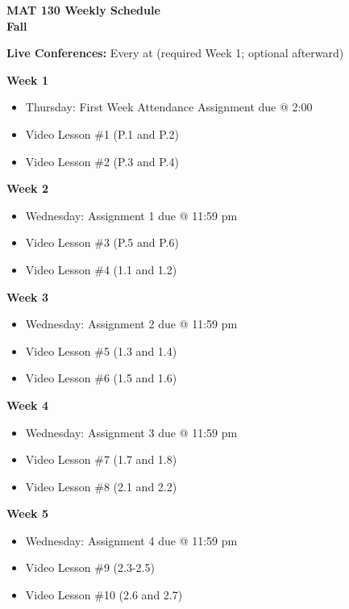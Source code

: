 \documentclass[12pt]{letter}
\author{Jacob Ayers}
\newcommand{\red}[1]{{\color{red}{#1}}} %
\newcommand{\?}{\stackrel{?}{=}}
\begin{document}
	
	\begin{center}
		\textbf{MAT 130 Weekly Schedule \\ Fall \red{Year}}
	\end{center}
	\textbf{Live Conferences:} Every \red{day} at \red{time} (required Week 1; optional afterward)
	
	\textbf{Week 1} \begin{itemize} \vspace{-12pt}
		\item Thursday: First Week Attendance Assignment due @ 2:00
		\item Video Lesson \#1 (P.1 and P.2)
		\item Video Lesson \#2 (P.3 and P.4)
	\end{itemize}

	\textbf{Week 2} \begin{itemize} \vspace{-12pt}
		\item Wednesday: Assignment 1 due @ 11:59 pm
		\item Video Lesson \#3 (P.5 and P.6)
		\item Video Lesson \#4 (1.1 and 1.2)
	\end{itemize}

	\textbf{Week 3} \begin{itemize} \vspace{-12pt}
		\item Wednesday: Assignment 2 due @ 11:59 pm
		\item Video Lesson \#5 (1.3 and 1.4)
		\item Video Lesson \#6 (1.5 and 1.6)
	\end{itemize}

	\textbf{Week 4} \begin{itemize} \vspace{-12pt}
		\item Wednesday: Assignment 3 due @ 11:59 pm
		\item Video Lesson \#7 (1.7 and 1.8)
		\item Video Lesson \#8 (2.1 and 2.2)
	\end{itemize}

	\textbf{Week 5} \begin{itemize} \vspace{-12pt}
		\item Wednesday: Assignment 4 due @ 11:59 pm
		\item Video Lesson \#9 (2.3-2.5)
		\item Video Lesson \#10 (2.6 and 2.7)
	\end{itemize}
\end{document}
